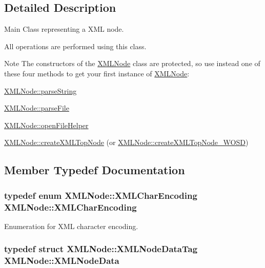 \subsection{Detailed Description}
Main Class representing a X\-M\-L node. 

All operations are performed using this class. \begin{DoxyNote}{Note}
The constructors of the \hyperlink{structXMLNode}{X\-M\-L\-Node} class are protected, so use instead one of these four methods to get your first instance of \hyperlink{structXMLNode}{X\-M\-L\-Node}\-: 
\begin{DoxyItemize}
\item \hyperlink{group__conversions_ga72125a4ccfae9b39bafab768346bbc7e}{X\-M\-L\-Node\-::parse\-String}  
\item \hyperlink{group__conversions_gae984d7ebce97fad429b2b786439815fb}{X\-M\-L\-Node\-::parse\-File}  
\item \hyperlink{group__conversions_ga46f99cf406604471e15d4378f74ecc63}{X\-M\-L\-Node\-::open\-File\-Helper}  
\item \hyperlink{group__creation_ga1e2d0403450db891eedc76b6bfdba452}{X\-M\-L\-Node\-::create\-X\-M\-L\-Top\-Node} (or \hyperlink{group__xmlWOSD_ga9c8b3bfa9671cb2a0a977ef30bab364a}{X\-M\-L\-Node\-::create\-X\-M\-L\-Top\-Node\-\_\-\-W\-O\-S\-D}) 
\end{DoxyItemize}
\end{DoxyNote}


\subsection{Member Typedef Documentation}
\hypertarget{structXMLNode_a81cfd85cde37d43408069f45205e3c8d}{
\subsubsection[{X\-M\-L\-Char\-Encoding}]{\setlength{\rightskip}{0pt plus 5cm}typedef enum X\-M\-L\-Node\-::\-X\-M\-L\-Char\-Encoding  X\-M\-L\-Node\-::\-X\-M\-L\-Char\-Encoding}}\label{structXMLNode_a81cfd85cde37d43408069f45205e3c8d}


Enumeration for X\-M\-L character encoding. 

\hypertarget{structXMLNode_a28beb729b21b81d2a59238fa755ba700}{
\subsubsection[{X\-M\-L\-Node\-Data}]{\setlength{\rightskip}{0pt plus 5cm}typedef struct X\-M\-L\-Node\-::\-X\-M\-L\-Node\-Data\-Tag  X\-M\-L\-Node\-::\-X\-M\-L\-Node\-Data\hspace{0.3cm}{\ttfamily [private]}}}\label{structXMLNode_a28beb729b21b81d2a59238fa755ba700}


